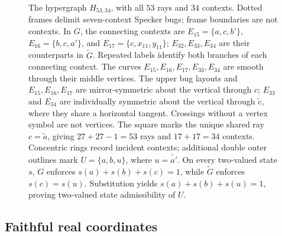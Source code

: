 \documentclass[aps,pra,reprint,superscriptaddress,longbibliography,nofootinbib,floatfix,10pt]{revtex4-2}
\theoremstyle{definition}\newtheorem{definition}[theorem]{Definition}
\theoremstyle{remark}\newtheorem{remark}[theorem]{Remark}
\begin{document}
\begin{figure}[!t]
\caption{The hypergraph $H_{53,34}$, with all $53$ rays and $34$ contexts. Dotted frames delimit seven-context Specker bugs; frame boundaries are not contexts. In $G$, the connecting contexts are $E_{15}=\{a,c,b'\}$, $E_{16}=\{b,c,a'\}$, and $E_{17}=\{c,x_{11},y_{11}\}$; $E_{32},E_{33},E_{34}$ are their counterparts in $\widetilde G$. Repeated labels identify both branches of each connecting context. The curves $E_{15},E_{16},E_{17},E_{33},E_{34}$ are smooth through their middle vertices. The upper bug layouts and $E_{15},E_{16},E_{17}$ are mirror-symmetric about the vertical through $c$; $E_{33}$ and $E_{34}$ are individually symmetric about the vertical through $\widetilde c$, where they share a horizontal tangent. Crossings without a vertex symbol are not vertices. The square marks the unique shared ray $c=\widetilde a$, giving $27+27-1=53$ rays and $17+17=34$ contexts. Concentric rings record incident contexts; additional double outer outlines mark $U=\{a,b,u\}$, where $u=\widetilde{a'}$. On every two-valued state $s$, $G$ enforces $s(a)+s(b)+s(c)=1$, while $\widetilde G$ enforces $s(c)=s(u)$. Substitution yields $s(a)+s(b)+s(u)=1$, proving two-valued state admissibility of $U$.}\label{fig:H53-34}
\end{figure}

\subsection{Faithful real coordinates}
\end{document}
